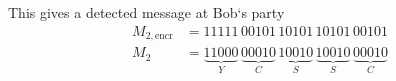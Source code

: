 This gives a detected message at Bob`s party
\begin{align}
  M_{2, \text{encr}} &= 11111 \, 
                        00101 \,
                        10101 \,
                        10101 \,
                        00101 \\
  M_{2} &= \underbrace{11000}_{Y} \, 
           \underbrace{00010}_{C} \,
           \underbrace{10010}_{S} \,
           \underbrace{10010}_{S} \,
           \underbrace{00010}_{C}
  \label{eqn:final_message}
\end{align}
